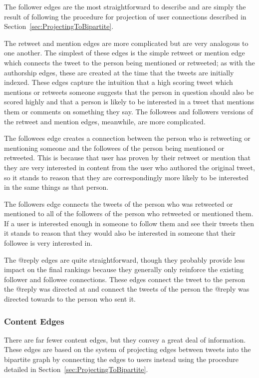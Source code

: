 The follower edges are the most straightforward to describe and are simply the result of following the procedure for projection of user connections described in Section~\ref{sec:ProjectingToBipartite}.

The retweet and mention edges are more complicated but are very analogous to one another. The simplest of these edges is the simple retweet or mention edge which connects the tweet to the person being mentioned or retweeted; as with the authorship edges, these are created at the time that the tweets are initially indexed. These edges capture the intuition that a high scoring tweet which mentions or retweets someone suggests that the person in question should also be scored highly and that a person is likely to be interested in a tweet that mentions them or comments on something they say. The followees and followers versions of the retweet and mention edges, meanwhile, are more complicated.

The followees edge creates a connection between the person who is retweeting or mentioning someone and the followees of the person being mentioned or retweeted. This is because that user has proven by their retweet or mention that they are very interested in content from the user who authored the original tweet, so it stands to reason that they are correspondingly more likely to be interested in the same things as that person.

The followers edge connects the tweets of the person who was retweeted or mentioned to all of the followers of the person who retweeted or mentioned them. If a user is interested enough in someone to follow them and see their tweets then it stands to reason that they would also be interested in someone that their followee is very interested in.

The @reply edges are quite straightforward, though they probably provide less impact on the final rankings because they generally only reinforce the existing follower and followee connections. These edges connect the tweet to the person the @reply was directed at and connect the tweets of the person the @reply was directed towards to the person who sent it.


\subsubsection{Content Edges}

There are far fewer content edges, but they convey a great deal of information. These edges are based on the system of projecting edges between tweets into the bipartite graph by connecting the edges to users instead using the procedure detailed in Section~\ref{sec:ProjectingToBipartite}.

